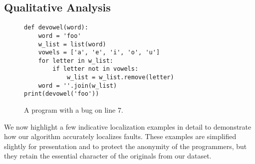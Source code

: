 \documentclass[conference]{IEEEtran}
\begin{document}




\subsection{Qualitative Analysis}

%
%
%
%
%
%

\begin{figure}
\begin{lstlisting}
def devowel(word):
    word = 'foo'
    w_list = list(word)
    vowels = ['a', 'e', 'i', 'o', 'u']
    for letter in w_list:
        if letter not in vowels:
            w_list = w_list.remove(letter)
    word = ''.join(w_list)
print(devowel('foo'))
\end{lstlisting}
\caption{A program with a bug on line 7.}
\label{fig-win-example-one}
\end{figure}


We now highlight a few indicative localization examples in detail to
demonstrate how our algorithm accurately localizes faults. 
These examples are simplified slightly for presentation and to protect the
anonymity of the programmers, but they retain the essential character of
the originals from our dataset.
\end{document}
